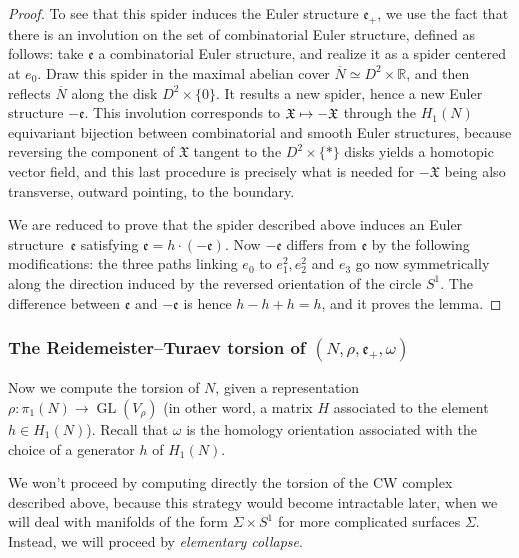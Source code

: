 \documentclass[10pt]{amsart}
\newcommand\mto{\mathchoice{\longmapsto}{\mapsto}{\mapsto}{\mapsto}}
\theoremstyle{plain}
\theoremstyle{definition}
\theoremstyle{remark}
\newcommand{\R}{\mathbb{R}}
\DeclareMathOperator{\GL}{GL}
\numberwithin{equation}{section}
\begin{document}
\begin{proof}
To see that this spider induces the Euler structure $\mathfrak e_+$, we use the fact that there is an involution on the set of combinatorial Euler structure, defined as follows:
take $\mathfrak e$ a combinatorial Euler structure, and realize it as a spider centered at $e_0$. Draw this spider in the maximal abelian cover $\overline N \simeq D^2 \times \R$, and then reflects $\overline N$ along the disk $D^2 \times \{ 0 \}$. It results a new spider, hence a new Euler structure $-\mathfrak e$. This involution corresponds to $\mathfrak X \mto -\mathfrak X$ through the $H_1(N)$ equivariant bijection between combinatorial and smooth Euler structures, because reversing the component of $\mathfrak X$ tangent to the $D^2 \times \{\ast \}$ disks yields a homotopic vector field, and this last procedure is precisely what is needed for $-\mathfrak X$ being also transverse, outward pointing, to the boundary.

We are reduced to prove that the spider described above induces an Euler structure~$\mathfrak e$ satisfying $\mathfrak e = h \cdot (-\mathfrak e)$. Now $-\mathfrak e$ differs from $\mathfrak e$ by the following modifications:
the three paths linking $e_0$ to $e_1^2, e_2^2$ and $e_3$ go now symmetrically along the direction induced by the reversed orientation of the circle $S^1$. The difference between $\mathfrak e$ and $-\mathfrak e$ is hence $h-h+h = h$, and it proves the lemma.
\end{proof}

\subsubsection*{The Reidemeister--Turaev torsion of $(N,\rho,\mathfrak e_+, \omega)$}
Now we compute the torsion of $N$, given a representation $\rho \colon \pi_1(N) \to \GL(V_\rho)$ (in other word, a matrix $H$ associated to the element $h \in H_1(N)$). Recall that $\omega$ is the homology orientation associated with the choice of a generator $h$ of $H_1(N)$.

We won't proceed by computing directly the torsion of the CW complex described above, because this strategy would become intractable later, when we will deal with manifolds of the form $\Sigma \times S^1$ for more complicated surfaces $\Sigma$. Instead, we will proceed by \emph{elementary collapse}.
\end{document}
